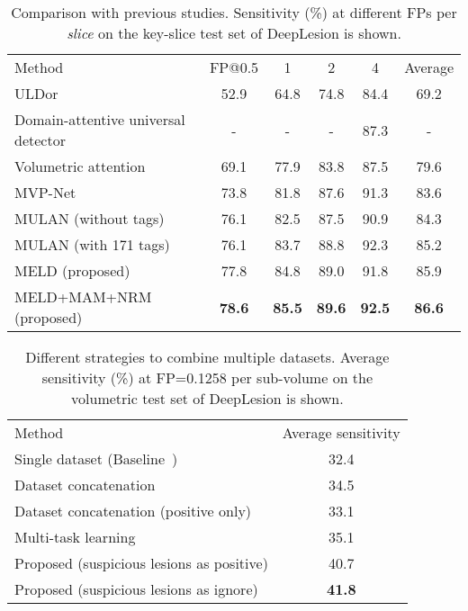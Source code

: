 \documentclass[runningheads]{llncs}
\begin{document}
\begin{table}[t]
	\begin{center}
\setlength{\tabcolsep}{4pt}
\caption{Comparison with previous studies. Sensitivity (\%) at different FPs per \textit{slice} on the key-slice test set of DeepLesion is shown.}
		\label{tbl:prior_art}
		\begin{tabular}{lccccc}
			\hline\noalign{\smallskip}
			Method	& FP@0.5	& 1	& 2	& 4	& Average \\
			\noalign{\smallskip}\hline\noalign{\smallskip}
			ULDor~\cite{Tang2019Uldor}	& 52.9	& 64.8	& 74.8	& 84.4	& 69.2	\\
			Domain-attentive universal detector~\cite{Wang2019universal}	& -	& -	& -	& 87.3	& -	\\
			Volumetric attention~\cite{Wang2019LiTS}	& 69.1	& 77.9	& 83.8	& 87.5	& 79.6 \\
			MVP-Net~\cite{Li2019MVP}	& 73.8	& 81.8	& 87.6	& 91.3	& 83.6 \\
			MULAN (without tags)~\cite{Yan2019MULAN}	& 76.1	&  82.5	& 87.5	& 90.9	& 84.3	\\
			MULAN (with 171 tags)~\cite{Yan2019MULAN}	& 76.1  & 83.7  & 88.8  & 92.3  & 85.2	\\
			MELD (proposed)				& 77.8	& 84.8	& 89.0	& 91.8	& 85.9	\\
			MELD+MAM+NRM (proposed)		& \bf 78.6	& \bf 85.5	& \bf 89.6	& \bf 92.5	& \bf 86.6	\\
			\hline
		\end{tabular}
		
	\end{center}
\end{table}

\begin{table}[t]
	\begin{center}
\setlength{\tabcolsep}{4pt}
\caption{Different strategies to combine multiple datasets. Average sensitivity (\%) at FP=0.1258 per sub-volume on the volumetric test set of DeepLesion is shown.}
		\label{tbl:multi_dataset}
		\begin{tabular}{lc}
			\hline\noalign{\smallskip}
			Method	&  Average sensitivity \\
			\noalign{\smallskip}\hline\noalign{\smallskip}
			Single dataset (Baseline~\cite{Yan2019MULAN})	& 32.4 \\
			Dataset concatenation	& 34.5 \\
			Dataset concatenation (positive only)	& 33.1 \\
			Multi-task learning	& 35.1 \\
			Proposed (suspicious lesions as positive)	& 40.7 \\
			Proposed (suspicious lesions as ignore)	& \bf 41.8 \\
			\hline
		\end{tabular} \vspace{-5mm}
	\end{center}
\end{table}
\end{document}
